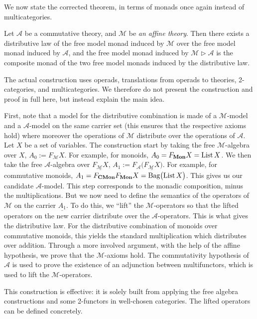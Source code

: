 We now state the corrected theorem, in terms of monads once again instead of multicategories.

\begin{theorem}
Let $\mathcal A$ be a commutative theory, and $\mathcal M$ be \emph{an affine theory}. Then there exists a distributive law of the free model monad induced by $\mathcal M$ over the free model monad induced by $\mathcal A$, and the free model monad induced by $\mathcal M \triangleright \mathcal A$ is the composite monad of the two free model monads induced by the distributive law.
\label{thm:correct}
\end{theorem}
 
The actual construction uses operads, translations from operads to theories, 2-categories, and multicategories. We therefore do not present the construction and proof in full here, but instead explain the main idea.

First, note that a model for the distributive combination is made of a $\mathcal{M}$-model and a $\mathcal{A}$-model on the same carrier set (this ensures that the respective axioms hold) where moreover the operations of $\mathcal{M}$ distribute over the operations of $\mathcal{A}$. Let $X$ be a set of variables. The construction start by taking the free $\mathcal{M}$-algebra over $X$, $A_0 := F_\mathcal{M} X$. For example, for monoids, $A_0 = F_{\mathbf{Mon}} X = \operatorname{List} X$. We then take the free $\mathcal{A}$-algebra over $\underline{F_\mathcal{M} X}$, $A_1 := F_\mathcal{A} \bigl( \underline{F_\mathcal{M} X} \bigr)$. For example, for commutative monoids, $A_1 = F_{\mathbf{CMon}} F_{\mathbf{Mon}} X = \mathrm{Bag} \bigl( \operatorname{List} X \bigr)$. This gives us our candidate $\mathcal{A}$-model. This step corresponds to the monadic composition, minus the multiplications. But we now need to define the semantics of the operators of $\mathcal{M}$ on the carrier $\underline{A_1}$. To do this, we ``lift'' the $\mathcal{M}$-operators so that the lifted operators on the new carrier distribute over the $\mathcal{A}$-operators. This is what gives the distributive law. For the distributive combination of monoids over commutative monoids, this yields the standard multiplication which distributes over addition. Through a more involved argument, with the help of the affine hypothesis, we prove that the $\mathcal{M}$-axioms hold. The commutativity hypothesis of $\mathcal{A}$ is used to prove the existence of an adjunction between multifunctors, which is used to lift the $\mathcal{M}$-operators.

This construction is effective: it is solely built from applying the free algebra constructions and some 2-functors in well-chosen categories. The lifted operators can be defined concretely.

